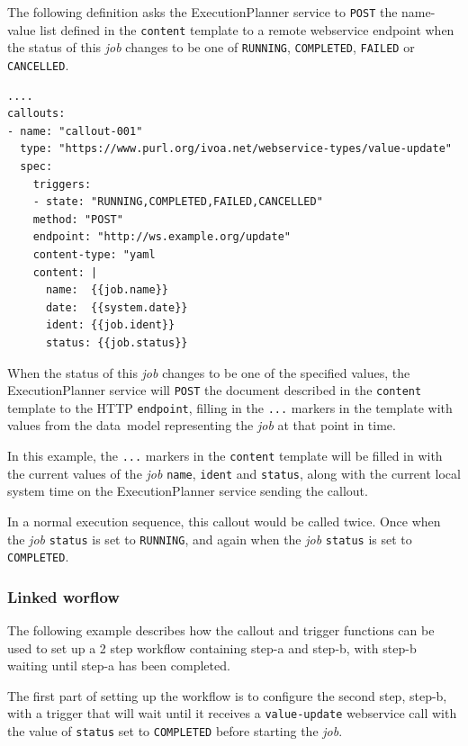 \documentclass[11pt,a4paper]{ivoa}
\newcommand{\datamodel} {data~model}
\newcommand{\webservice} {webservice}
\newcommand{\execplanner} {ExecutionPlanner}
\newcommand{\codeword}[1] {\texttt{#1}}
\newcommand{\job} {\textit{job}}
\begin{document}
The following definition asks the \execplanner{} service to \codeword{POST} the name-value list defined in the
\codeword{content} template to a remote \webservice{} endpoint when the status of this \job{} changes to be one
of \codeword{RUNNING}, \codeword{COMPLETED}, \codeword{FAILED} or \codeword{CANCELLED}.

\begin{lstlisting}[]
....
callouts:
- name: "callout-001"
  type: "https://www.purl.org/ivoa.net/webservice-types/value-update"
  spec:
    triggers:
    - state: "RUNNING,COMPLETED,FAILED,CANCELLED"
    method: "POST"
    endpoint: "http://ws.example.org/update"
    content-type: "yaml
    content: |
      name:  {{job.name}}
      date:  {{system.date}}
      ident: {{job.ident}}
      status: {{job.status}}
\end{lstlisting}

When the status of this \job{} changes to be one of the specified values, the
\execplanner{} service will \codeword{POST} the document described in the
\codeword{content} template to the HTTP \codeword{endpoint}, filling in the \codeword{{{...}}}
markers in the template with values from the \datamodel{} representing the \job{}
at that point in time.

In this example, the \codeword{{{...}}} markers in the \codeword{content} template will be filled
in with the current values of the \job{} \codeword{name}, \codeword{ident} and \codeword{status},
along with the current local system time on the \execplanner{} service sending the callout.

In a normal execution sequence, this callout would be called twice. Once when the \job{} \codeword{status}
is set to \codeword{RUNNING}, and again when the \job{} \codeword{status} is set to \codeword{COMPLETED}.

\subsubsection{Linked worflow}
\label{linked-worflow}

The following example describes how the callout and trigger functions can be used to
set up a 2 step workflow containing step-a and step-b, with step-b waiting until
step-a has been completed.

The first part of setting up the workflow is to configure the second step, step-b, with a trigger that
will wait until it receives a \codeword{value-update} \webservice{} call with the
value of \codeword{status} set to \codeword{COMPLETED} before starting the \job{}.
\end{document}
